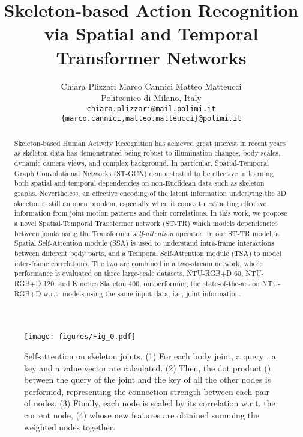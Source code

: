 \documentclass[review]{cvpr}
\begin{document}
\title{Skeleton-based Action Recognition \\via Spatial and  Temporal Transformer Networks}

\author{Chiara Plizzari \qquad Marco Cannici \qquad Matteo Matteucci \\
Politecnico di Milano, Italy\\
{\tt\small chiara.plizzari@mail.polimi.it} \\
{\tt\small \{marco.cannici,matteo.matteucci\}@polimi.it}


}

\maketitle


\begin{abstract}
Skeleton-based Human Activity Recognition has achieved great interest in recent years as skeleton data has demonstrated being robust to illumination changes, body scales, dynamic camera views, and complex background. In particular, Spatial-Temporal Graph Convolutional Networks (ST-GCN) demonstrated to be effective in learning both spatial and temporal dependencies on non-Euclidean data such as skeleton graphs. Nevertheless, an effective encoding of the latent information underlying the 3D skeleton is still an open problem, especially when it comes to extracting effective information from joint motion patterns and their correlations. 
In this work, we propose a novel Spatial-Temporal Transformer network (ST-TR) which models dependencies between joints using the Transformer \textit{self-attention} operator. In our ST-TR model, a Spatial Self-Attention module (SSA) is used to understand intra-frame interactions between different body parts, and a Temporal Self-Attention module (TSA) to model inter-frame correlations. The two are combined in a two-stream network, whose performance is evaluated on three large-scale datasets, NTU-RGB+D 60, NTU-RGB+D 120, and Kinetics Skeleton 400, outperforming the state-of-the-art on NTU-RGB+D w.r.t. models using the same input data, i.e., joint information.
\end{abstract}
 \begin{figure}[t]
    \begin{center}
    \texttt{[image: figures/Fig\_0.pdf]}
    \end{center}
    \caption{{Self-attention on skeleton joints}. (1) For each body joint, a query , a key  and a value vector  are calculated. (2) Then, the dot product () between the query of the joint and the key of all the other nodes is performed, representing the connection strength between each pair of nodes. (3) Finally, each node is scaled by its correlation w.r.t. the current node, (4) whose new features are obtained summing the weighted nodes together. 
    }
    \label{fig0}
\end{figure}
\end{document}
